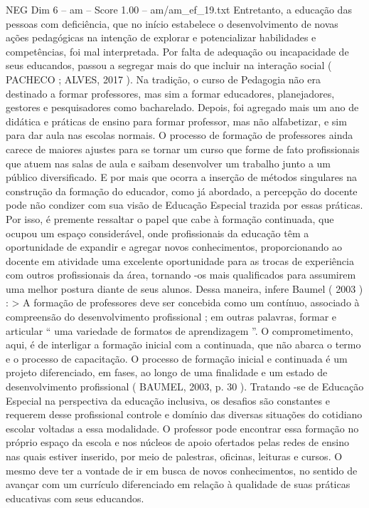 \begin{textsample}{NEG Dim 6 – am – Score 1.00 – am/am\_ef\_19.txt}
Entretanto, a educação das pessoas com deficiência, que no início estabelece o desenvolvimento de novas ações pedagógicas na intenção de explorar e potencializar habilidades e competências, foi mal interpretada.
Por falta de adequação ou incapacidade de seus educandos, passou a segregar mais do que incluir na interação social ( PACHECO ; ALVES, 2017 ).
Na tradição, o curso de Pedagogia não era destinado a formar professores, mas sim a formar educadores, planejadores, gestores e pesquisadores como bacharelado.
Depois, foi agregado mais um ano de didática e práticas de ensino para formar professor, mas não alfabetizar, e sim para dar aula nas escolas normais.
O processo de formação de professores ainda carece de maiores ajustes para se tornar um curso que forme de fato profissionais que atuem nas salas de aula e saibam desenvolver um trabalho junto a um público diversificado.
E por mais que ocorra a inserção de métodos singulares na construção da formação do educador, como já abordado, a percepção do docente pode não condizer com sua visão de Educação Especial trazida por essas práticas.
Por isso, é premente ressaltar o papel que cabe à formação continuada, que ocupou um espaço considerável, onde profissionais da educação têm a oportunidade de expandir e agregar novos conhecimentos, proporcionando ao docente em atividade uma excelente oportunidade para as trocas de experiência com outros profissionais da área, tornando -os mais qualificados para assumirem uma melhor postura diante de seus alunos.
Dessa maneira, infere Baumel ( 2003 ) : > A formação de professores deve ser concebida como um contínuo, associado à compreensão do desenvolvimento profissional ; em outras palavras, formar e articular “ uma variedade de formatos de aprendizagem ”.
O comprometimento, aqui, é de interligar a formação inicial com a continuada, que não abarca o termo e o processo de capacitação.
O processo de formação inicial e continuada é um projeto diferenciado, em fases, ao longo de uma finalidade e um estado de desenvolvimento profissional ( BAUMEL, 2003, p. 30 ).
Tratando -se de Educação Especial na perspectiva da educação inclusiva, os desafios são constantes e requerem desse profissional controle e domínio das diversas situações do cotidiano escolar voltadas a essa modalidade.
O professor pode encontrar essa formação no próprio espaço da escola e nos núcleos de apoio ofertados pelas redes de ensino nas quais estiver inserido, por meio de palestras, oficinas, leituras e cursos.
O mesmo deve ter a vontade de ir em busca de novos conhecimentos, no sentido de avançar com um currículo diferenciado em relação à qualidade de suas práticas educativas com seus educandos.

\end{textsample}
